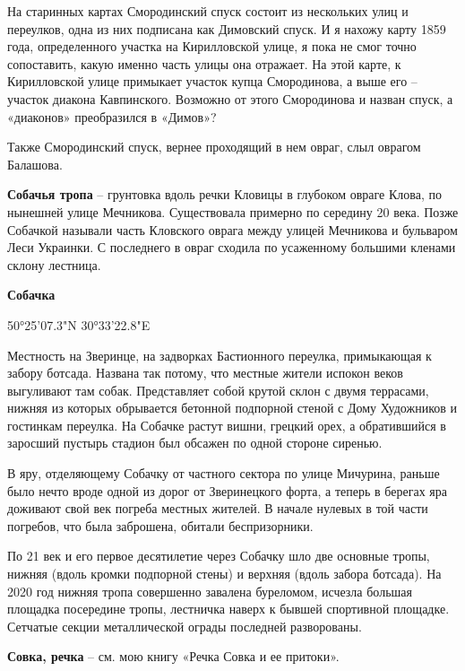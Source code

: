 На старинных картах Смородинский спуск состоит из нескольких улиц и переулков, одна из них подписана как Димовский спуск. И я нахожу карту 1859 года, определенного участка на Кирилловской улице, я пока не смог точно сопоставить, какую именно часть улицы она отражает. На этой карте, к Кирилловской улице примыкает участок купца Смородинова, а выше его – участок диакона Кавпинского. Возможно от этого Смородинова и назван спуск, а «диаконов» преобразился в «Димов»? 

Также Смородинский спуск, вернее проходящий в нем овраг, слыл оврагом Балашова.\\

\medskip

\textbf{Собачья тропа} – грунтовка вдоль речки Кловицы в глубоком овраге Клова, по нынешней улице Мечникова. Существовала примерно по середину 20 века. Позже Собачкой называли часть Кловского оврага между улицей Мечникова и бульваром Леси Украинки. С последнего в овраг сходила по усаженному большими кленами склону лестница.\\

\newpage

\textbf{Собачка} 

50°25'07.3"N 30°33'22.8"E

Местность на Зверинце, на задворках Бастионного переулка, примыкающая к забору ботсада. Названа так потому, что местные жители испокон веков выгуливают там собак. Представляет собой крутой склон с двумя террасами, нижняя из которых обрывается бетонной подпорной стеной с Дому Художников и гостинкам переулка. На Собачке растут вишни, грецкий орех, а обратившийся в заросший пустырь стадион был обсажен по одной стороне сиренью.

В яру, отделяющему Собачку от частного сектора по улице Мичурина, раньше было нечто вроде одной из дорог от Зверинецкого форта, а теперь в берегах яра доживают свой век погреба местных жителей. В начале нулевых в той части погребов, что была заброшена, обитали беспризорники.

По 21 век и его первое десятилетие через Собачку шло две основные тропы, нижняя (вдоль кромки подпорной стены) и верхняя (вдоль забора ботсада). На 2020 год нижняя тропа совершенно завалена буреломом, исчезла большая площадка посередине тропы, лестничка наверх к бывшей спортивной площадке. Сетчатые секции металлической ограды последней разворованы.\\

\medskip

\textbf{Совка, речка} – см. мою книгу «Речка Совка и ее притоки».\\

